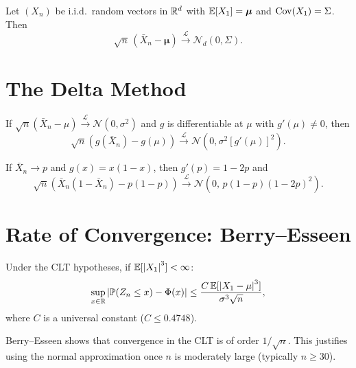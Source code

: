\begin{theorem}
Let $(X_n)$ be i.i.d.\ random vectors in $\mathbb{R}^d$ with $\mathbb{E}[X_1] = \boldsymbol{\mu}$
and $\mathrm{Cov}(X_1) = \Sigma$. Then
\[
    \sqrt{n}\,(\bar{X}_n - \boldsymbol{\mu})
    \xrightarrow{\mathcal{L}} \mathcal{N}_d(0, \Sigma).
\]
\end{theorem}

\section{The Delta Method}

\begin{theorem}
\label{thm:delta}
If $\sqrt{n}(\bar{X}_n - \mu) \xrightarrow{\mathcal{L}} \mathcal{N}(0, \sigma^2)$
and $g$ is differentiable at $\mu$ with $g'(\mu) \neq 0$, then
\[
    \sqrt{n}(g(\bar{X}_n) - g(\mu))
    \xrightarrow{\mathcal{L}} \mathcal{N}(0, \sigma^2[g'(\mu)]^2).
\]
\end{theorem}

\begin{example}
If $\bar{X}_n \to p$ and $g(x) = x(1-x)$, then $g'(p) = 1-2p$ and
\[
    \sqrt{n}(\bar{X}_n(1-\bar{X}_n) - p(1-p))
    \xrightarrow{\mathcal{L}} \mathcal{N}(0,\, p(1-p)(1-2p)^2).
\]
\end{example}

\section{Rate of Convergence: Berry--Esseen}

\begin{theorem}
Under the CLT hypotheses, if $\mathbb{E}[\left| X_1 \right|^3] < \infty$:
\[
    \sup_{x \in \mathbb{R}}\left| \mathbb{P}(Z_n \leq x) - \Phi(x) \right|
    \leq \frac{C\,\mathbb{E}[\left| X_1-\mu \right|^3]}{\sigma^3\sqrt{n}},
\]
where $C$ is a universal constant ($C \leq 0.4748$).
\end{theorem}

\begin{remark}
Berry--Esseen shows that convergence in the CLT is of order $1/\sqrt{n}$.
This justifies using the normal approximation once $n$ is moderately large
(typically $n \geq 30$).
\end{remark}


